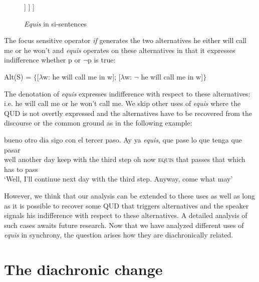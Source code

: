 \documentclass[output=paper
,modfonts
,nonflat]{langsci/langscibook}
\begin{document}

\begin{figure}
	\caption{\textit{Equis} in si-sentences\label{fig:kellert:tree3}}
	\begin{forest}
		[DiscourseP
			[\textit{Equis}] [CP
				[C\textsuperscript{0}\\\textit{si}][TP
				[\textit{me llama},roof]
		    	]
			]
		]
	\end{forest}
\end{figure}

The focus sensitive operator \textit{if} generates the two alternatives he either will call me or he won’t and \textit{equis} operates on these alternatives in that it expresses indifference whether p or $¬$p is true:

\ea Alt(S) = $\lbrace${[}$\lambda$w: he will call me in w{]}; {[}$\lambda$w: $¬$ he will call me in w{]}$\rbrace$
\z

The denotation of \textit{equis} expresses indifference with respect to these alternatives: i.e. he will call me or he won’t call me. We skip other uses of \textit{equis} where the QUD is not overtly expressed and the alternatives have to be recovered from the discourse or the common ground as in the following example:

\ea
\gll bueno otro dia sigo con el tercer paso. Ay ya \textit{equis}, que pase lo que tenga que pasar\\
well another day keep with the third step oh now \textsc{equis} that passes that which has to pass\\
\glt ‘Well, I’ll continue next day with the third step. Anyway, come what may’
\z

However, we think that our analysis can be extended to these uses as well as long as it is possible to recover some QUD that triggers alternatives and the speaker signals his indifference with respect to these alternatives. A detailed analysis of such cases awaits future research.
Now that we have analyzed different uses of \textit{equis} in synchrony, the question arises how they are diachronically related.

\section{The diachronic change}\label{sec:kellert:4}
\end{document}
